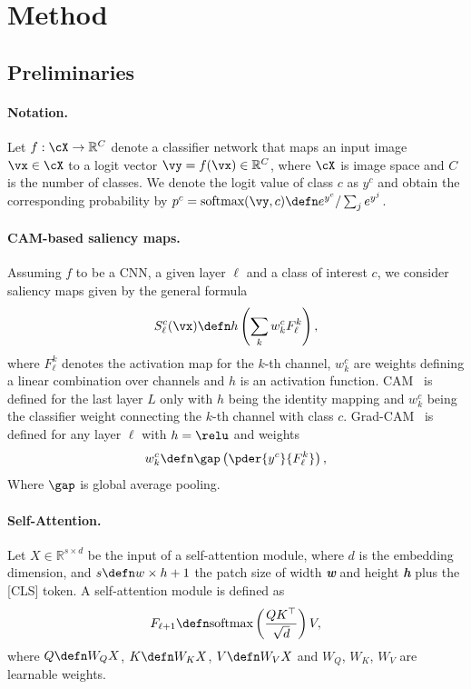 \section{Method}

\subsection{Preliminaries}

\paragraph{Notation.}
Let $f: \cX \rightarrow \mathbb{R}^C$ denote a classifier network that maps an input image $\vx \in \cX$ to a logit vector $\vy= f(\vx) \in \mathbb{R}^C$, where $\cX$ is image space and $C$ is the number of classes. We denote the logit value of class $c$ as $y^c$ and obtain the corresponding probability by $p^c = \mbox{softmax}(\vy, c) \defn e^{y^c} / \sum_j e^{y^j}$.

\paragraph{CAM-based saliency maps.}
Assuming $f$ to be a CNN, a given layer $\ell$ and a class of interest $c$, we consider saliency maps given by the general formula
\begin{equation}
	S^c_\ell(\vx) \defn h \left( \sum_k w^c_k F^k_\ell \right),
\label{eq:sal}
\end{equation}
where $F^k_\ell$ denotes the activation map for the $k$-th channel, $w^c_k$ are weights defining a linear combination over channels and $h$ is an activation function. CAM~\citep{zhou2016learning} is defined for the last layer $L$ only with $h$ being the identity mapping and $w^c_k$ being the classifier weight connecting the $k$-th channel with class $c$. Grad-CAM~\citep{DBLP:journals/corr/SelvarajuDVCPB16} is defined for any layer $\ell$ with $h = \relu$ and weights
\begin{equation}
	w^c_k \defn \gap \left( \pder{y^c}{F^k_\ell} \right),
\label{eq:gcam}
\end{equation}
Where $\gap$ is global average pooling.

\paragraph{Self-Attention.}
Let $X \in \mathbb{R}^{s \times d}$ be the input of a self-attention module, where $d$ is the embedding dimension, and $s \defn w \times h + 1$ the patch size of width \textbf{\textit{w}} and height \textbf{\textit{h}} plus the [CLS] token. A self-attention module is defined as %
\begin{equation}
    F_{\ell+1} \defn \mbox{softmax} \left( \frac{QK^{\top}}{\sqrt{d}} \right) V,
    \label{eq:self-attention}
\end{equation}
where $Q\defn W_Q X$, $K\defn W_K X$, $V\defn W_V X$ and $W_Q$, $W_K$, $W_V$ are learnable weights.\\

